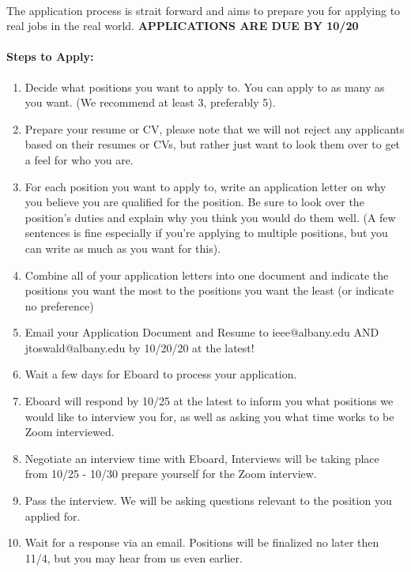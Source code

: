 \documentclass{article}
\begin{document}
\paragraph{}
The application process is strait forward and aims to prepare you for applying to real jobs in the real world. \textbf{APPLICATIONS ARE DUE BY 10/20}

\paragraph{Steps to Apply:}
\begin{enumerate}
    \item Decide what positions you want to apply to. You can apply to as many as you want. (We recommend at least 3, preferably 5).
    \item Prepare your resume or CV, please note that we will not reject any applicants based on their resumes or CVs, but rather just want to look them over to get a feel for who you are.
    \item For each position you want to apply to, write an application letter on why you believe you are qualified for the position. Be sure to look over the position's duties and explain why you think you would do them well. (A few sentences is fine especially if you're applying to multiple positions, but you can write as much as you want for this).
    \item Combine all of your application letters into one document and indicate the positions you want the most to the positions you want the least (or indicate no preference)
    \item Email your Application Document and Resume to ieee@albany.edu AND jtoswald@albany.edu by 10/20/20 at the latest!
    \item Wait a few days for Eboard to process your application.
    \item Eboard will respond by 10/25 at the latest to inform you what positions we would like to interview you for, as well as asking you what time works to be Zoom interviewed.
    \item Negotiate an interview time with Eboard, Interviews will be taking place from 10/25 - 10/30 prepare yourself for the Zoom interview.
    \item Pass the interview. We will be asking questions relevant to the position you applied for. 
    \item Wait for a response via an email. Positions will be finalized no later then 11/4, but you may hear from us even earlier.
\end{enumerate}
\end{document}
